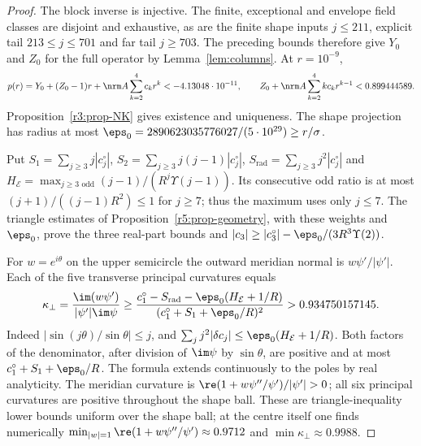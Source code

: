\begin{proof}
The block inverse is injective. The finite, exceptional and envelope field classes are disjoint and exhaustive, as are the finite shape inputs $j\leq211$, explicit tail $213\leq j\leq701$ and far tail $j\geq703$. The preceding bounds therefore give $Y_0$ and $Z_0$ for the full operator by Lemma~\ref{lem:columns}. At $r=10^{-9}$,
\[
p(r)=Y_0+(Z_0-1)r+\nrm A\sum_{k=2}^4c_kr^k<-4.13048\cdot10^{-11},\qquad
Z_0+\nrm A\sum_{k=2}^4kc_kr^{k-1}<0.899444589.
\]
Proposition~\ref{r3:prop-NK} gives existence and uniqueness. The shape projection has radius at most
$\eps_0=2890623035776027/(5\cdot10^{29})\geq r/\sigma$.

Put $S_1=\sum_{j\geq3}j|c^\circ_j|$, $S_2=\sum_{j\geq3}j(j-1)|c^\circ_j|$, $S_{\mathrm{rad}}=\sum_{j\geq3}j^2|c^\circ_j|$ and
$H_{\mathcal E}=\max_{j\geq3\text{ odd}}(j-1)/(R^j\Upsilon(j-1))$. Its consecutive odd ratio is at most $(j+1)/((j-1)R^2)\leq1$ for $j\geq7$; thus the maximum uses only $j\leq7$. The triangle estimates of Proposition~\ref{r5:prop-geometry}, with these weights and $\eps_0$, prove the three real-part bounds and $|c_3|\geq|c^\circ_3|-\eps_0/(3R^3\Upsilon(2))$.

For $w=e^{i\theta}$ on the upper semicircle the outward meridian normal is $w\psi'/|\psi'|$. Each of the five transverse principal curvatures equals
\[
\kappa_\perp=\frac{\im(w\psi')}{|\psi'|\im\psi}\geq
\frac{c^\circ_1-S_{\mathrm{rad}}-\eps_0(H_{\mathcal E}+1/R)}{(c^\circ_1+S_1+\eps_0/R)^2}>0.934750157145.
\]
Indeed $|\sin(j\theta)/\sin\theta|\leq j$, and $\sum_jj^2|\delta c_j|\leq\eps_0(H_{\mathcal E}+1/R)$. Both factors of the denominator, after division of $\im\psi$ by $\sin\theta$, are positive and at most $c^\circ_1+S_1+\eps_0/R$. The formula extends continuously to the poles by real analyticity. The meridian curvature is $\re(1+w\psi''/\psi')/|\psi'|>0$; all six principal curvatures are positive throughout the shape ball. These are triangle-inequality lower bounds uniform over the shape ball; at the centre itself one finds numerically $\min_{|w|=1}\re(1+w\psi''/\psi')\approx0.9712$ and $\min\kappa_\perp\approx0.9988$.


\end{proof}
